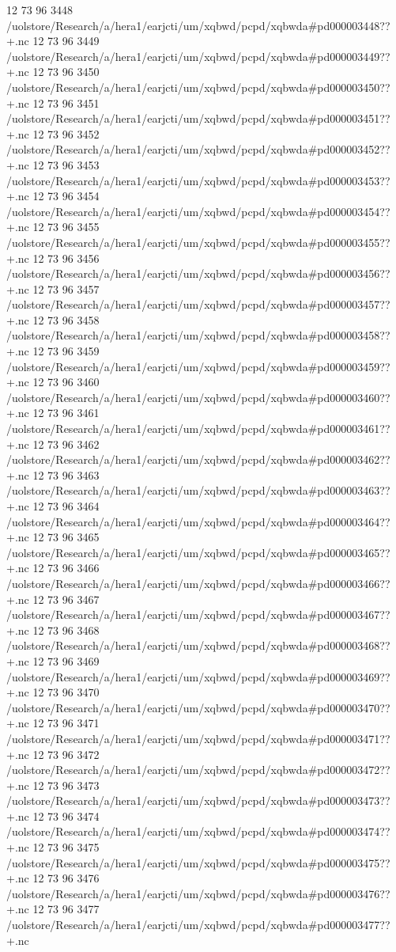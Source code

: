 12 73 96
3448
/uolstore/Research/a/hera1/earjcti/um/xqbwd/pcpd/xqbwda#pd000003448??+.nc
12 73 96
3449
/uolstore/Research/a/hera1/earjcti/um/xqbwd/pcpd/xqbwda#pd000003449??+.nc
12 73 96
3450
/uolstore/Research/a/hera1/earjcti/um/xqbwd/pcpd/xqbwda#pd000003450??+.nc
12 73 96
3451
/uolstore/Research/a/hera1/earjcti/um/xqbwd/pcpd/xqbwda#pd000003451??+.nc
12 73 96
3452
/uolstore/Research/a/hera1/earjcti/um/xqbwd/pcpd/xqbwda#pd000003452??+.nc
12 73 96
3453
/uolstore/Research/a/hera1/earjcti/um/xqbwd/pcpd/xqbwda#pd000003453??+.nc
12 73 96
3454
/uolstore/Research/a/hera1/earjcti/um/xqbwd/pcpd/xqbwda#pd000003454??+.nc
12 73 96
3455
/uolstore/Research/a/hera1/earjcti/um/xqbwd/pcpd/xqbwda#pd000003455??+.nc
12 73 96
3456
/uolstore/Research/a/hera1/earjcti/um/xqbwd/pcpd/xqbwda#pd000003456??+.nc
12 73 96
3457
/uolstore/Research/a/hera1/earjcti/um/xqbwd/pcpd/xqbwda#pd000003457??+.nc
12 73 96
3458
/uolstore/Research/a/hera1/earjcti/um/xqbwd/pcpd/xqbwda#pd000003458??+.nc
12 73 96
3459
/uolstore/Research/a/hera1/earjcti/um/xqbwd/pcpd/xqbwda#pd000003459??+.nc
12 73 96
3460
/uolstore/Research/a/hera1/earjcti/um/xqbwd/pcpd/xqbwda#pd000003460??+.nc
12 73 96
3461
/uolstore/Research/a/hera1/earjcti/um/xqbwd/pcpd/xqbwda#pd000003461??+.nc
12 73 96
3462
/uolstore/Research/a/hera1/earjcti/um/xqbwd/pcpd/xqbwda#pd000003462??+.nc
12 73 96
3463
/uolstore/Research/a/hera1/earjcti/um/xqbwd/pcpd/xqbwda#pd000003463??+.nc
12 73 96
3464
/uolstore/Research/a/hera1/earjcti/um/xqbwd/pcpd/xqbwda#pd000003464??+.nc
12 73 96
3465
/uolstore/Research/a/hera1/earjcti/um/xqbwd/pcpd/xqbwda#pd000003465??+.nc
12 73 96
3466
/uolstore/Research/a/hera1/earjcti/um/xqbwd/pcpd/xqbwda#pd000003466??+.nc
12 73 96
3467
/uolstore/Research/a/hera1/earjcti/um/xqbwd/pcpd/xqbwda#pd000003467??+.nc
12 73 96
3468
/uolstore/Research/a/hera1/earjcti/um/xqbwd/pcpd/xqbwda#pd000003468??+.nc
12 73 96
3469
/uolstore/Research/a/hera1/earjcti/um/xqbwd/pcpd/xqbwda#pd000003469??+.nc
12 73 96
3470
/uolstore/Research/a/hera1/earjcti/um/xqbwd/pcpd/xqbwda#pd000003470??+.nc
12 73 96
3471
/uolstore/Research/a/hera1/earjcti/um/xqbwd/pcpd/xqbwda#pd000003471??+.nc
12 73 96
3472
/uolstore/Research/a/hera1/earjcti/um/xqbwd/pcpd/xqbwda#pd000003472??+.nc
12 73 96
3473
/uolstore/Research/a/hera1/earjcti/um/xqbwd/pcpd/xqbwda#pd000003473??+.nc
12 73 96
3474
/uolstore/Research/a/hera1/earjcti/um/xqbwd/pcpd/xqbwda#pd000003474??+.nc
12 73 96
3475
/uolstore/Research/a/hera1/earjcti/um/xqbwd/pcpd/xqbwda#pd000003475??+.nc
12 73 96
3476
/uolstore/Research/a/hera1/earjcti/um/xqbwd/pcpd/xqbwda#pd000003476??+.nc
12 73 96
3477
/uolstore/Research/a/hera1/earjcti/um/xqbwd/pcpd/xqbwda#pd000003477??+.nc
